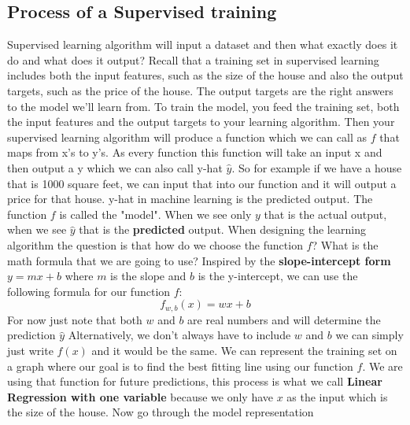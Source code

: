 \subsection{Process of a Supervised training}
Supervised learning algorithm will input a dataset and then what exactly does it do and what does it output? 
Recall that a training set in supervised learning includes both the input features, such as the size of the house and also the output targets, such as the price of the house. The output targets are the right answers to the model we'll learn from.
To train the model, you feed the training set, both the input features and the output targets to your learning algorithm. Then your supervised learning algorithm will produce a function which we can call as $f$ that maps from x's to y's.
As every function this function will take an input x and then output a y which we can also call y-hat $\hat{y}$. So for example if we have a house that is 1000 square feet, we can input that into our function and it will output a price for that house.
y-hat in machine learning is the predicted output.
The function $f$ is called the "model". When we see only $y$ that is the actual output, when we see $\hat{y}$ that is the \textbf{predicted} output.
When designing the learning algorithm the question is that how do we choose the function $f$? What is the math formula that we are going to use? 
Inspired by the \textbf{slope-intercept form} $y=mx+b$ where $m$ is the slope and $b$ is the y-intercept, we can use the following formula for our function $f$:
$$ f_{w,b}(x) = wx + b $$ 
For now just note that both $w$ and $b$ are real numbers and will determine the prediction $\hat{y}$
Alternatively, we don't always have to include $w$ and $b$ we can simply just write $f(x)$ and it would be the same. 
We can represent the training set on a graph where our goal is to find the best fitting line using our function $f$.
We are using that function for future predictions, this process is what we call \textbf{Linear Regression with one variable} because we only have $x$ as the input which is the size of the house.
Now go through the model representation

